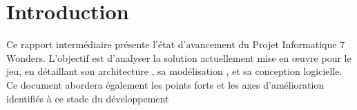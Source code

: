\section{Introduction}
\label{sec:introduction}

Ce rapport intermédiaire présente l'état d'avancement du Projet Informatique 7 Wonders. L'objectif est d'analyser la solution actuellement mise en œuvre pour le jeu, en détaillant son architecture , sa modélisation , et sa conception logicielle. Ce document abordera également les points forts et les axes d'amélioration identifiés à ce stade du développement